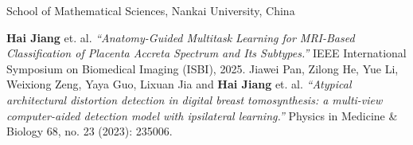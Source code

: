 \documentclass[11pt,a4paper, final]{moderncv}
\newcommand{\spacesection}{\vspace{0.4cm}}
\begin{document}
	{}{}{School of Mathematical Sciences, Nankai University, China}
\nocite{*}

	\begin{thebibliography}{99}
		\bibitem[1]{} 
					\textbf{Hai Jiang} et. al. 
					\emph{``Anatomy-Guided Multitask Learning for MRI-Based Classification of Placenta Accreta Spectrum and Its Subtypes.''} 
					IEEE International Symposium on Biomedical Imaging (ISBI), 2025.
		\bibitem[2]{} 
					Jiawei Pan, Zilong He, Yue Li, Weixiong Zeng, Yaya Guo, Lixuan Jia and \textbf{Hai Jiang} et. al. 
					\emph{``Atypical architectural distortion detection in digital breast tomosynthesis: a multi-view computer-aided detection model with ipsilateral learning.''} 
					Physics in Medicine \& Biology 68, no. 23 (2023): 235006.
	\end{thebibliography}
\end{document}
